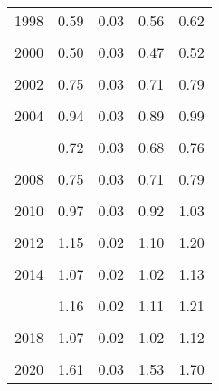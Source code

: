 \begin{table}
\begin{tabular}[t]{rrrrr}
1998 & 0.59 & 0.03 & 0.56 & 0.62\\
\cellcolor{gray!6}{1999} & \cellcolor{gray!6}{0.70} & \cellcolor{gray!6}{0.03} & \cellcolor{gray!6}{0.66} & \cellcolor{gray!6}{0.74}\\
2000 & 0.50 & 0.03 & 0.47 & 0.52\\
\addlinespace
\cellcolor{gray!6}{2001} & \cellcolor{gray!6}{0.65} & \cellcolor{gray!6}{0.03} & \cellcolor{gray!6}{0.62} & \cellcolor{gray!6}{0.69}\\
2002 & 0.75 & 0.03 & 0.71 & 0.79\\
\cellcolor{gray!6}{2003} & \cellcolor{gray!6}{0.87} & \cellcolor{gray!6}{0.03} & \cellcolor{gray!6}{0.82} & \cellcolor{gray!6}{0.91}\\
2004 & 0.94 & 0.03 & 0.89 & 0.99\\
\cellcolor{gray!6}{2005} & \cellcolor{gray!6}{0.85} & \cellcolor{gray!6}{0.03} & \cellcolor{gray!6}{0.81} & \cellcolor{gray!6}{0.89}\\
\addlinespace
2006 & 0.72 & 0.03 & 0.68 & 0.76\\
\cellcolor{gray!6}{2007} & \cellcolor{gray!6}{0.72} & \cellcolor{gray!6}{0.03} & \cellcolor{gray!6}{0.69} & \cellcolor{gray!6}{0.76}\\
2008 & 0.75 & 0.03 & 0.71 & 0.79\\
\cellcolor{gray!6}{2009} & \cellcolor{gray!6}{0.80} & \cellcolor{gray!6}{0.03} & \cellcolor{gray!6}{0.76} & \cellcolor{gray!6}{0.85}\\
2010 & 0.97 & 0.03 & 0.92 & 1.03\\
\addlinespace
\cellcolor{gray!6}{2011} & \cellcolor{gray!6}{1.17} & \cellcolor{gray!6}{0.02} & \cellcolor{gray!6}{1.12} & \cellcolor{gray!6}{1.23}\\
2012 & 1.15 & 0.02 & 1.10 & 1.20\\
\cellcolor{gray!6}{2013} & \cellcolor{gray!6}{1.07} & \cellcolor{gray!6}{0.02} & \cellcolor{gray!6}{1.03} & \cellcolor{gray!6}{1.12}\\
2014 & 1.07 & 0.02 & 1.02 & 1.13\\
\cellcolor{gray!6}{2015} & \cellcolor{gray!6}{1.00} & \cellcolor{gray!6}{0.02} & \cellcolor{gray!6}{0.95} & \cellcolor{gray!6}{1.05}\\
\addlinespace
2016 & 1.16 & 0.02 & 1.11 & 1.21\\
\cellcolor{gray!6}{2017} & \cellcolor{gray!6}{1.26} & \cellcolor{gray!6}{0.02} & \cellcolor{gray!6}{1.20} & \cellcolor{gray!6}{1.31}\\
2018 & 1.07 & 0.02 & 1.02 & 1.12\\
\cellcolor{gray!6}{2019} & \cellcolor{gray!6}{1.15} & \cellcolor{gray!6}{0.02} & \cellcolor{gray!6}{1.10} & \cellcolor{gray!6}{1.20}\\
2020 & 1.61 & 0.03 & 1.53 & 1.70\\
\bottomrule
\end{tabular}
\end{table}
